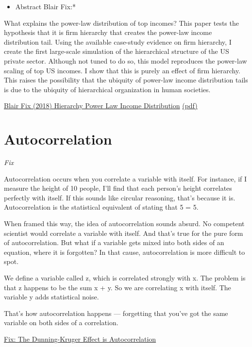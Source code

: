 \documentclass[
]{book}
\providecommand{\tightlist}{%
  \setlength{\itemsep}{0pt}\setlength{\parskip}{0pt}}
\begin{document}
\begin{itemize}
\tightlist
\item
  Abstract Blair Fix:*
\end{itemize}

What explains the power-law distribution of top incomes? This paper tests the
hypothesis that it is firm hierarchy that creates the power-law income distribution tail.
Using the available case-study evidence on firm hierarchy, I create the
first large-scale simulation of the hierarchical structure of the US private sector.
Although not tuned to do so, this model reproduces the power-law scaling of
top US incomes. I show that this is purely an effect of firm hierarchy. This raises
the possibility that the ubiquity of power-law income distribution tails is due to
the ubiquity of hierarchical organization in human societies.

\href{https://osf.io/u95dk/}{Blair Fix (2018) Hierarchy Power Law Income Distribution}
\href{pdf/Blair_Fix_2018_Hierarchy_Power_law.pdf}{(pdf)}

\hypertarget{autocorrelation}{%
\chapter{Autocorrelation}\label{autocorrelation}}

\emph{Fix}

Autocorrelation occurs when you correlate a variable with itself. For instance, if I measure the height of 10 people, I'll find that each person's height correlates perfectly with itself. If this sounds like circular reasoning, that's because it is. Autocorrelation is the statistical equivalent of stating that 5 = 5.

When framed this way, the idea of autocorrelation sounds absurd. No competent scientist would correlate a variable with itself. And that's true for the pure form of autocorrelation. But what if a variable gets mixed into both sides of an equation, where it is forgotten? In that cause, autocorrelation is more difficult to spot.

We define a variable called z, which is correlated strongly with x. The problem is that z happens to be the sum x + y. So we are correlating x with itself. The variable y adds statistical noise.

That's how autocorrelation happens --- forgetting that you've got the same variable on both sides of a correlation.

\href{https://economicsfromthetopdown.com/2022/04/08/the-dunning-kruger-effect-is-autocorrelation/}{Fix: The Dunning-Kruger Effect is Autocorrelation}
\end{document}
